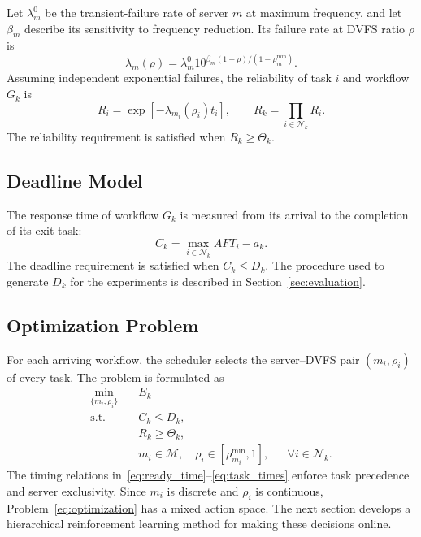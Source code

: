 \documentclass[lettersize,journal]{IEEEtran}
\begin{document}
Let $\lambda_m^0$ be the transient-failure rate of server $m$ at maximum
frequency, and let $\beta_m$ describe its sensitivity to frequency reduction.
Its failure rate at DVFS ratio $\rho$ is
\begin{equation}
    \lambda_m(\rho)=\lambda_m^0
    10^{\beta_m(1-\rho)/(1-\rho_m^{\min})}.
    \label{eq:frequency_failure_rate}
\end{equation}
Assuming independent exponential failures, the reliability of task $i$ and
workflow $G_k$ is
\begin{equation}
    R_i=\exp[-\lambda_{m_i}(\rho_i)t_i],
    \qquad
    R_k=\prod_{i\in\mathcal{N}_k}R_i.
    \label{eq:workflow_reliability}
\end{equation}
The reliability requirement is satisfied when $R_k\geq\Theta_k$.

\subsection{Deadline Model}
\label{sec:deadline_model}

The response time of workflow $G_k$ is measured from its arrival to the
completion of its exit task:
\begin{equation}
    C_k=\max_{i\in\mathcal{N}_k}AFT_i-a_k.
    \label{eq:workflow_response_time}
\end{equation}
The deadline requirement is satisfied when $C_k\leq D_k$. The procedure used
to generate $D_k$ for the experiments is described in
Section~\ref{sec:evaluation}.

\subsection{Optimization Problem}
\label{sec:optimization_problem}

For each arriving workflow, the scheduler selects the server--DVFS pair
$(m_i,\rho_i)$ of every task. The problem is formulated as
\begin{subequations}
\label{eq:optimization}
\begin{align}
    \min_{\{m_i,\rho_i\}}
    \quad & E_k
    \label{eq:optimization_objective}\\
    \text{s.t.}\quad
    & C_k\leq D_k,
    \label{eq:constraint_deadline}\\
    & R_k\geq\Theta_k,
    \label{eq:constraint_reliability}\\
    & m_i\in\mathcal{M},\quad
      \rho_i\in[\rho_{m_i}^{\min},1],
    && \forall i\in\mathcal{N}_k.
    \label{eq:constraint_actions}
\end{align}
\end{subequations}
The timing relations in~\eqref{eq:ready_time}--\eqref{eq:task_times} enforce
task precedence and server exclusivity. Since $m_i$ is discrete and $\rho_i$ is
continuous, Problem~\eqref{eq:optimization} has a mixed action space. The next
section develops a hierarchical reinforcement learning method for making these
decisions online.
\end{document}

